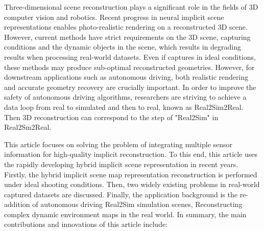 \begin{abstractEn}
Three-dimensional scene reconstruction plays a significant role in the fields of 3D computer vision and robotics. 
Recent progress in neural implicit scene representations enables photo-realistic rendering on a reconstructed 3D scene. However, current methods have strict requirements on the 3D scene, capturing conditions and the dynamic objects in the scene, which results in degrading results when processing real-world datasets. Even if captures in ideal conditions, these methods may produce sub-optimal reconstructed geometries.  However, for downstream applications such as autonomous driving, both realistic rendering and accurate geometry recovery are crucially important. In order to improve the safety of autonomous driving algorithms, researchers are striving to achieve a data loop from real to simulated and then to real, known as Real2Sim2Real. Then 3D reconstruction can correspond to the step of "Real2Sim" in Real2Sm2Real.

This article focuses on solving the problem of integrating multiple sensor information for high-quality implicit reconstruction. To this end, this article uses the rapidly developing hybrid implicit scene representation in recent years. Firstly, the hybrid implicit scene map representation reconstruction is performed under ideal shooting conditions. Then, two widely existing problems in real-world captured datasets are discussed. Finally, the application background is the re-addition of autonomous driving Real2Sim simulation scenes, Reconstructing complex dynamic environment maps in the real world. In summary, the main contributions and innovations of this article include:


\end{abstractEn}

